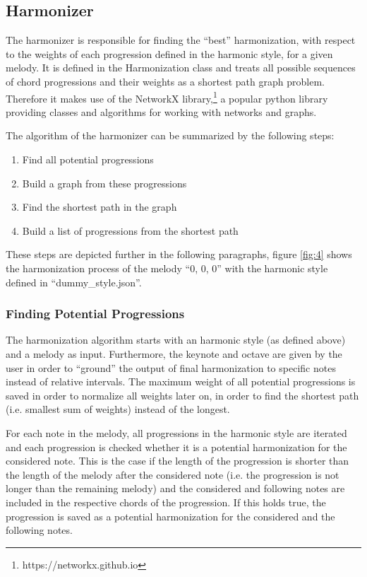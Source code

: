 \subsection{Harmonizer}
The harmonizer is responsible for finding the ``best'' harmonization, with respect to the weights of each progression defined in the harmonic style, for a given melody. It is defined in the Harmonization class and treats all possible sequences of chord progressions and their weights as a shortest path graph problem. Therefore it makes use of the NetworkX library,\footnote{https://networkx.github.io} a popular python library providing classes and algorithms for working with networks and graphs. 

The algorithm of the harmonizer can be summarized by the following steps:
\begin{enumerate}
  \item Find all potential progressions
  \item Build a graph from these progressions
  \item Find the shortest path in the graph
  \item Build a list of progressions from the shortest path
\end{enumerate}
These steps are depicted further in the following paragraphs, figure \ref{fig:4} shows the harmonization process of the melody ``0, 0, 0'' with the harmonic style defined in ``dummy\_style.json''.

\subsubsection{Finding Potential Progressions}
The harmonization algorithm starts with an harmonic style (as defined above) and a melody as input. Furthermore, the keynote and octave are given by the user in order to ``ground'' the output of final harmonization to specific notes instead of relative intervals. The maximum weight of all potential progressions is saved in order to normalize all weights later on, in order to find the shortest path (i.e. smallest sum of weights) instead of the longest.

For each note in the melody, all progressions in the harmonic style are iterated and each progression is checked whether it is a potential harmonization for the considered note. This is the case if the length of the progression is shorter than the length of the melody after the considered note (i.e. the progression is not longer than the remaining melody) and the considered and following notes are included in the respective chords of the progression. If this holds true, the progression is saved as a potential harmonization for the considered and the following notes.

